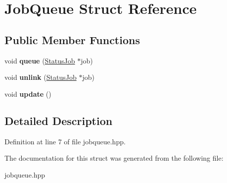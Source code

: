 \hypertarget{struct_job_queue}{\section{Job\-Queue Struct Reference}
\label{struct_job_queue}
}
\subsection*{Public Member Functions}
\begin{DoxyCompactItemize}
\item 
\hypertarget{struct_job_queue_a1481b2b329815e064d108e078ad86a40}{void {\bfseries queue} (\hyperlink{struct_status_job}{Status\-Job} $\ast$job)}\label{struct_job_queue_a1481b2b329815e064d108e078ad86a40}

\item 
\hypertarget{struct_job_queue_aa97130eb26603ec90cae7883c0f83f94}{void {\bfseries unlink} (\hyperlink{struct_status_job}{Status\-Job} $\ast$job)}\label{struct_job_queue_aa97130eb26603ec90cae7883c0f83f94}

\item 
\hypertarget{struct_job_queue_a642e5a86cee74874a6c6ae3e8ff47da2}{void {\bfseries update} ()}\label{struct_job_queue_a642e5a86cee74874a6c6ae3e8ff47da2}

\end{DoxyCompactItemize}


\subsection{Detailed Description}


Definition at line 7 of file jobqueue.\-hpp.



The documentation for this struct was generated from the following file\-:\begin{DoxyCompactItemize}
\item 
jobqueue.\-hpp\end{DoxyCompactItemize}
